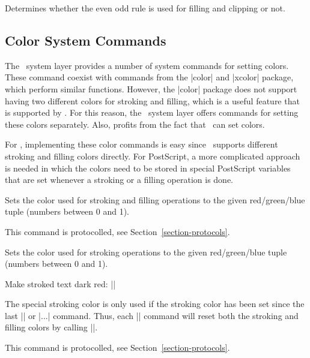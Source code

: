 {\let\ifpgfsys@eorule=\relax
\begin{command}{\ifpgfsys@eorule}
    Determines whether the even odd rule is used for filling and clipping or
    not.
\end{command}
}


\subsection{Color System Commands}

The \pgfname\ system layer provides a number of system commands for setting
colors. These command coexist with commands from the |color| and |xcolor|
package, which perform similar functions. However, the |color| package does not
support having two different colors for stroking and filling, which is a useful
feature that is supported by \pgfname. For this reason, the \pgfname\ system
layer offers commands for setting these colors separately. Also, 
profits from the fact that \pgfname\ can set colors.

For \pdf, implementing these color commands is easy since \pdf\ supports
different stroking and filling colors directly. For PostScript, a more
complicated approach is needed in which the colors need to be stored in special
PostScript variables that are set whenever a stroking or a filling operation is
done.

\begin{command}{\pgfsys@color@rgb{}}
    Sets the color used for stroking and filling operations to the given
    red/green/blue tuple (numbers between 0 and 1).

    This command is protocolled, see Section~\ref{section-protocols}.
\end{command}

\begin{command}{\pgfsys@color@rgb@stroke{}}
    Sets the color used for stroking operations to the given red/green/blue
    tuple (numbers between 0 and 1).

    \example Make stroked text dark red: ||

    The special stroking color is only used if the stroking color has been set
    since the last |\color| or |\pgfsys@color@...| command. Thus, each |\color|
    command will reset both the stroking and filling colors by calling
    |\pgfsys@color@reset|.

    This command is protocolled, see Section~\ref{section-protocols}.
\end{command}

